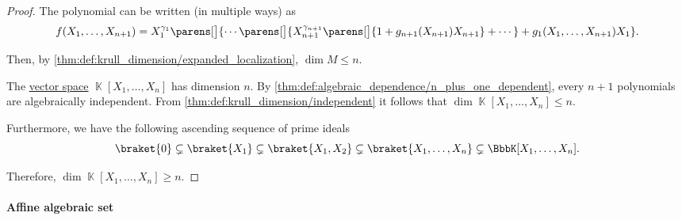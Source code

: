 \begin{proof}
  The polynomial can be written (in multiple ways) as
  \begin{equation*}
    f(X_1, \ldots, X_{n+1}) = X_1^{\gamma_1} \parens[\big]{ \cdots \parens[\big]{ X_{n+1}^{\gamma_{n+1}} \parens[\big]{ 1 + g_{n+1}(X_{n+1}) X_{n+1} } + \cdots } + g_1(X_1, \ldots, X_{n+1}) X_1 }.
  \end{equation*}

  Then, by \cref{thm:def:krull_dimension/expanded_localization}, \( \dim M \leq n \).

   The \hyperref[def:vector_space]{vector space} \( \BbbK[X_1, \ldots, X_n] \) has dimension \( n \). By \cref{thm:def:algebraic_dependence/n_plus_one_dependent}, every \( n + 1 \) polynomials are algebraically independent. From \cref{thm:def:krull_dimension/independent} it follows that \( \dim \BbbK[X_1, \ldots, X_n] \leq n \).

  Furthermore, we have the following ascending sequence of prime ideals
  \begin{equation*}
    \braket{ 0 } \subsetneq \braket{ X_1 } \subsetneq \braket{ X_1, X_2 } \subsetneq \braket{ X_1, \ldots, X_n } \subsetneq \BbbK[X_1, \ldots, X_n].
  \end{equation*}

  Therefore, \( \dim \BbbK[X_1, \ldots, X_n] \geq n \).
\end{proof}

\paragraph{Affine algebraic set}


